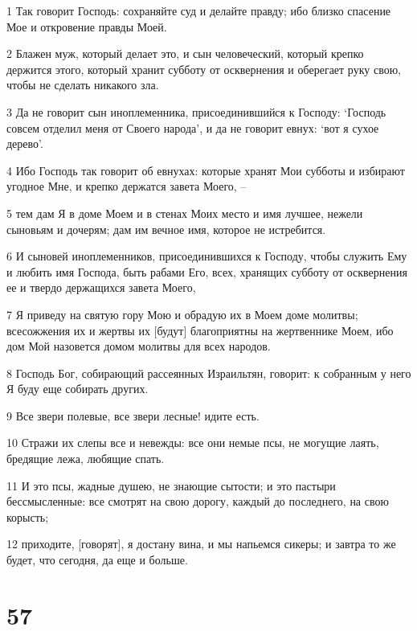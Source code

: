 \par 1 Так говорит Господь: сохраняйте суд и делайте правду; ибо близко спасение Мое и откровение правды Моей.
\par 2 Блажен муж, который делает это, и сын человеческий, который крепко держится этого, который хранит субботу от осквернения и оберегает руку свою, чтобы не сделать никакого зла.
\par 3 Да не говорит сын иноплеменника, присоединившийся к Господу: `Господь совсем отделил меня от Своего народа', и да не говорит евнух: `вот я сухое дерево'.
\par 4 Ибо Господь так говорит об евнухах: которые хранят Мои субботы и избирают угодное Мне, и крепко держатся завета Моего, --
\par 5 тем дам Я в доме Моем и в стенах Моих место и имя лучшее, нежели сыновьям и дочерям; дам им вечное имя, которое не истребится.
\par 6 И сыновей иноплеменников, присоединившихся к Господу, чтобы служить Ему и любить имя Господа, быть рабами Его, всех, хранящих субботу от осквернения ее и твердо держащихся завета Моего,
\par 7 Я приведу на святую гору Мою и обрадую их в Моем доме молитвы; всесожжения их и жертвы их [будут] благоприятны на жертвеннике Моем, ибо дом Мой назовется домом молитвы для всех народов.
\par 8 Господь Бог, собирающий рассеянных Израильтян, говорит: к собранным у него Я буду еще собирать других.
\par 9 Все звери полевые, все звери лесные! идите есть.
\par 10 Стражи их слепы все и невежды: все они немые псы, не могущие лаять, бредящие лежа, любящие спать.
\par 11 И это псы, жадные душею, не знающие сытости; и это пастыри бессмысленные: все смотрят на свою дорогу, каждый до последнего, на свою корысть;
\par 12 приходите, [говорят], я достану вина, и мы напьемся сикеры; и завтра то же будет, что сегодня, да еще и больше.

\chapter{57}


